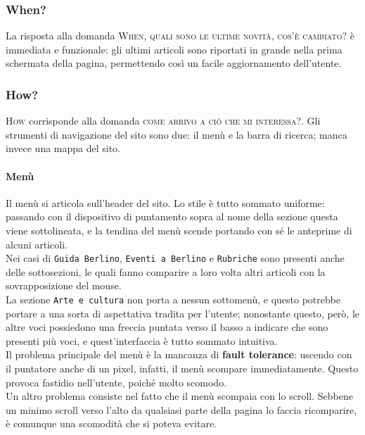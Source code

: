 \subsubsection{When?}
La risposta alla domanda \textsc{When}, \textsc{quali sono le ultime novità, cos'è cambiato?} è immediata e funzionale: gli ultimi articoli sono riportati in grande nella prima schermata della pagina, permettendo così un facile aggiornamento dell'utente.

\subsubsection{How?}
\textsc{How} corrisponde alla domanda \textsc{come arrivo a ciò che mi interessa?}. Gli strumenti di navigazione del sito sono due: il menù e la barra di ricerca; manca invece una mappa del sito.

\paragraph*{Menù}

Il menù si articola sull'header del sito. Lo stile è tutto sommato uniforme: passando con il dispositivo di puntamento sopra al nome della sezione questa viene sottolineata, e la tendina del menù scende portando con sé le anteprime di alcuni articoli. \\
Nei casi di \texttt{Guida Berlino}, \texttt{Eventi a Berlino} e \texttt{Rubriche} sono presenti anche delle sottosezioni, le quali fanno comparire a loro volta altri articoli con la sovrapposizione del mouse. \\
La sezione \texttt{Arte e cultura} non porta a nessun sottomenù, e questo potrebbe portare a una sorta di aspettativa tradita per l'utente; nonostante questo, però, le altre voci possiedono una freccia puntata verso il basso a indicare che sono presenti più voci, e quest'interfaccia è tutto sommato intuitiva. \\
Il problema principale del menù è la mancanza di \textbf{fault tolerance}: uscendo con il puntatore anche di un pixel, infatti, il menù scompare immediatamente. Questo provoca fastidio nell'utente, poiché molto scomodo. \\
Un altro problema consiste nel fatto che il menù scompaia con lo scroll. Sebbene un minimo scroll verso l'alto da qualsiasi parte della pagina lo faccia ricomparire, è comunque una scomodità che si poteva evitare.

